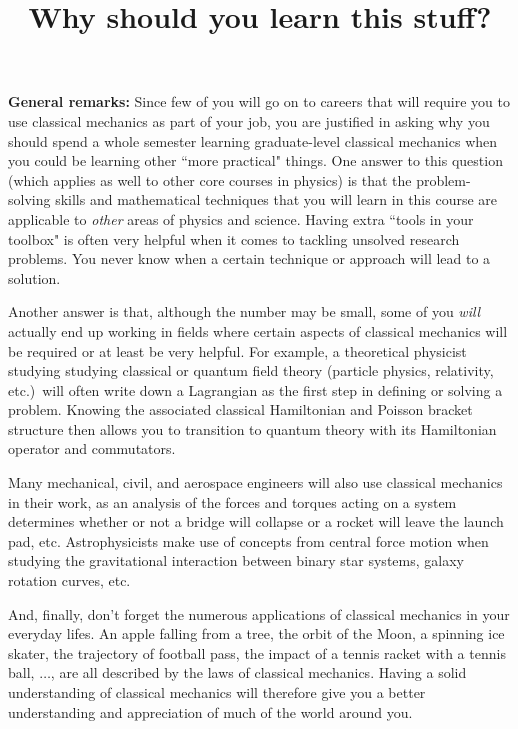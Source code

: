 \documentclass[10pt]{article}
\numberwithin{equation}{section}
\begin{document}
\setlength{\parindent}{0pt}
\setlength{\parskip}{\medskipamount}

\title{Why should you learn this stuff?}
\maketitle

{\bf General remarks:}
Since few of you will go on to careers that will 
require you to use classical mechanics as part of your
job, you are justified in asking why you should spend a 
whole semester learning graduate-level classical mechanics
when you could be learning other ``more practical" things.
One answer to this question (which applies as well to 
other core courses in physics) is that the problem-solving 
skills and mathematical techniques that you will learn 
in this course are applicable to {\em other} areas 
of physics and science.
Having extra ``tools in your toolbox" is often very helpful
when it comes to tackling unsolved research problems.
You never know when a certain technique or approach will 
lead to a solution.

Another answer is that, although the number may be small,
some of you {\em will} actually 
end up working in fields where certain aspects of classical 
mechanics will be required or at least be very helpful.
For example, a theoretical physicist studying studying 
classical or quantum field theory (particle physics, 
relativity, etc.)\ will often write 
down a Lagrangian as the first step in defining or 
solving a problem. 
Knowing the associated classical Hamiltonian and 
Poisson bracket structure then allows you to transition 
to quantum theory with its Hamiltonian operator and commutators.

Many mechanical, civil, and aerospace engineers 
will also use classical mechanics in their work, as an analysis 
of the forces and torques acting on a system determines 
whether or not a bridge will collapse or a rocket will leave 
the launch pad, etc.
Astrophysicists make use of concepts from central force 
motion when studying the gravitational interaction between 
binary star systems, galaxy rotation curves, etc.

And, finally, don't forget the numerous applications of
classical mechanics in your everyday lifes.  
An apple falling from a tree, 
the orbit of the Moon, a spinning ice skater,
the trajectory of football pass, the impact of 
a tennis racket with a tennis ball, $\ldots$, are all described 
by the laws of classical mechanics.
Having a solid understanding of classical mechanics will 
therefore give you a better understanding and appreciation 
of much of the world around you.
\end{document}
